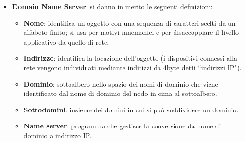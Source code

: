 \documentclass[11pt, italian, openany]{book}
\begin{document}
\begin{sloppypar}
\begin{itemize}[topsep=0pt, itemsep=0pt, parsep=0pt]
	I mail server moderni permettono la negoziazione per l'invio di dati in codifica binaria (quindi a 8bit), se non ha successo si inviano caratteri ASCII 7bit
	seguendo il \textbf{protocollo MIME}. MIME fornisce regole di codifica e decodifica per trasformare caratteri speciali e contenuti multimediali in caratteri
	ASCII 7bit (in questo modo, si garantisce la retrocompatibilit\`a con i mail server e non con gli user agent), permette inoltre l'uso di pi\`u codifiche
	all'interno dello stesso messaggio con il tipo ``multipart'', che specifica il ``boundary'' (confine) tra ciascuna.

	Per indicare la fine di un messaggio si usa la seguenza di caratteri ``\textless{CLRF}\textgreater{.}\textless{CLRF}\textgreater{"}. Vengono messi a
	disposizione i seguenti comandi:
	\begin{itemize}[topsep=0pt, itemsep=0pt, parsep=0pt]
		\item \textbf{HELO} \textless{client identifier}\textgreater{;}
		\item \textbf{MAIL FROM:}\textless{\textbf{reverse-path}\textgreater{\textless{CRLF}\textgreater{;}}}
		\item \textbf{RCPT TO:}\textless{\textbf{forward-path}\textgreater{CRLF\textgreater{;}}}
		\item \textbf{DATA};
		\item \textbf{QUIT}.
	\end{itemize}

	Si veda la figura \ref{fig:smtp-esempi}.

	SMTP \`e un protocollo di tipo ``push", per la ricezione risulta necessario un protocollo di tipo ``pull". Alcuni esempi sono: Post Office Protocol
	(\textbf{POP}), Internet Mail Access Protocol (\textbf{IMAP}), \textbf{HTTP} (quando user agent \`e un browser).

	\item \textbf{Domain Name Server}: si danno in merito le seguenti definizioni:
	\begin{itemize}[topsep=0pt, itemsep=0pt, parsep=0pt]
		\item \textbf{Nome}: identifica un oggetto con una sequenza di caratteri scelti da un alfabeto finito; si usa per motivi mnemonici e per disaccoppiare
		il livello applicativo da quello di rete.
		\item \textbf{Indirizzo}: identifica la locazione dell'oggetto (i dispositivi connessi alla rete vengono individuati mediante indirizzi da 4byte detti
		``indirizzi IP").
		\item \textbf{Dominio}: sottoalbero nello spazio dei nomi di dominio che viene identificato dal nome di dominio del nodo in cima al sottoalbero.
		\item \textbf{Sottodomini}: insieme dei domini in cui si pu\`o suddividere un dominio.
		\item \textbf{Name server}: programma che gestisce la conversione da nome di dominio a indirizzo IP.
	\end{itemize}



\end{itemize}
\end{sloppypar}
\end{document}
